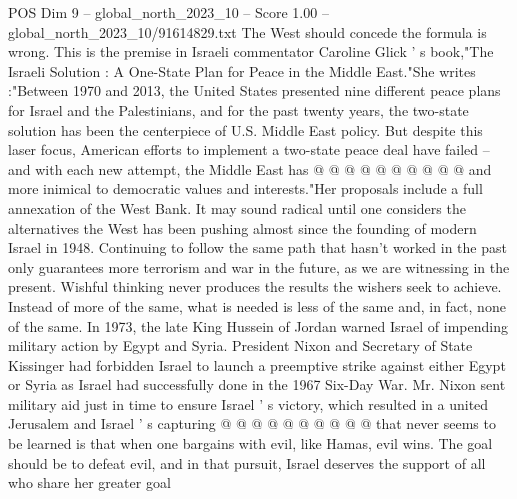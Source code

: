 \begin{textsample}{POS Dim 9 – global\_north\_2023\_10 – Score 1.00 – global\_north\_2023\_10/91614829.txt}
The West should concede the formula is wrong.
This is the premise in Israeli commentator Caroline Glick ' s book,"The Israeli Solution : A One-State Plan for Peace in the Middle East."She writes :"Between 1970 and 2013, the United States presented nine different peace plans for Israel and the Palestinians, and for the past twenty years, the two-state solution has been the centerpiece of U.S.
Middle East policy.
But despite this laser focus, American efforts to implement a two-state peace deal have failed -- and with each new attempt, the Middle East has @ @ @ @ @ @ @ @ @ @ and more inimical to democratic values and interests."Her proposals include a full annexation of the West Bank.
It may sound radical until one considers the alternatives the West has been pushing almost since the founding of modern Israel in 1948.
Continuing to follow the same path that hasn't worked in the past only guarantees more terrorism and war in the future, as we are witnessing in the present.
Wishful thinking never produces the results the wishers seek to achieve.
Instead of more of the same, what is needed is less of the same and, in fact, none of the same.
In 1973, the late King Hussein of Jordan warned Israel of impending military action by Egypt and Syria.
President Nixon and Secretary of State Kissinger had forbidden Israel to launch a preemptive strike against either Egypt or Syria as Israel had successfully done in the 1967 Six-Day War.
Mr.
Nixon sent military aid just in time to ensure Israel ' s victory, which resulted in a united Jerusalem and Israel ' s capturing @ @ @ @ @ @ @ @ @ @ that never seems to be learned is that when one bargains with evil, like Hamas, evil wins.
The goal should be to defeat evil, and in that pursuit, Israel deserves the support of all who share her greater goal

\end{textsample}
